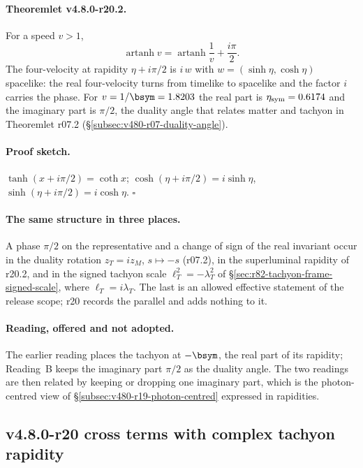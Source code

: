 \paragraph{Theoremlet v4.8.0-r20.2.}
For a speed \(v>1\),
\[
\operatorname{artanh}v=\operatorname{artanh}\frac1v+\frac{i\pi}{2}.
\]
The four-velocity at rapidity \(\eta+i\pi/2\) is \(i\,w\) with \(w=(\sinh\eta,\cosh\eta)\) spacelike: the real
four-velocity turns from timelike to spacelike and the factor \(i\) carries the phase.  For \(v=1/\bsym=1.8203\) the real
part is \(\eta_{\rm sym}=0.6174\) and the imaginary part is \(\pi/2\), the duality angle that relates matter and tachyon
in Theoremlet r07.2 (\S\ref{subsec:v480-r07-duality-angle}).

\paragraph{Proof sketch.}
\(\tanh(x+i\pi/2)=\coth x\); \(\cosh(\eta+i\pi/2)=i\sinh\eta\), \(\sinh(\eta+i\pi/2)=i\cosh\eta\).  \(\square\)

\paragraph{The same structure in three places.}
A phase \(\pi/2\) on the representative and a change of sign of the real invariant occur in the duality rotation
\(z_T=iz_M\), \(s\mapsto-s\) (r07.2), in the superluminal rapidity of r20.2, and in the signed tachyon scale
\(\ell_T^2=-\lambda_T^2\) of \S\ref{sec:r82-tachyon-frame-signed-scale}, where \(\ell_T=i\lambda_T\).  The last is an
allowed effective statement of the release scope; r20 records the parallel and adds nothing to it.

\paragraph{Reading, offered and not adopted.}
The earlier reading places the tachyon at \(-\bsym\), the real part of its rapidity; Reading~B keeps the imaginary part
\(\pi/2\) as the duality angle.  The two readings are then related by keeping or dropping one imaginary part, which is
the photon-centred view of \S\ref{subsec:v480-r19-photon-centred} expressed in rapidities.

\subsection*{v4.8.0-r20 cross terms with complex tachyon rapidity}
\label{subsec:v480-r20-cross-terms}

